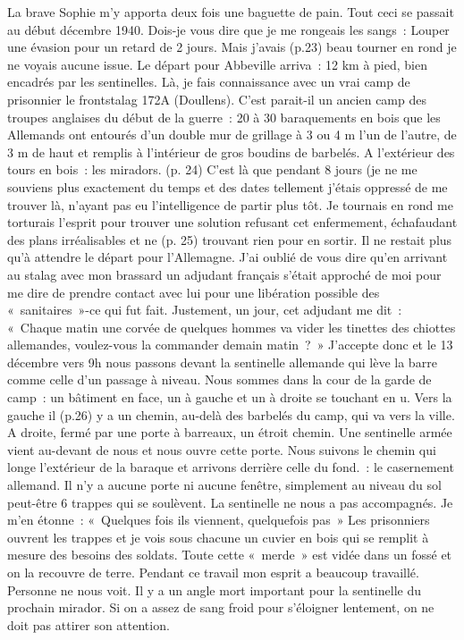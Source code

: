 \documentclass[a5paper,pagesize,10pt,bibtotoc,pointlessnumbers,
normalheadings,DIV=9,twoside=false]{scrbook}
\begin{document}
	La brave Sophie m’y apporta deux fois une baguette de pain. Tout ceci se passait au début décembre 1940. Dois-je vous dire que je me rongeais les sangs : Louper une évasion pour un retard de 2 jours. Mais j’avais (p.23) beau tourner en rond je ne voyais aucune issue.
	Le départ pour Abbeville arriva : 12 km à pied, bien encadrés par les sentinelles.
	Là, je fais connaissance avec un vrai camp de prisonnier le frontstalag 172A (Doullens). C’est parait-il un ancien camp des troupes anglaises du début de la guerre : 20 à 30 baraquements en bois que les Allemands ont entourés d’un double mur de grillage à 3 ou 4 m l’un de l’autre, de 3 m de haut et remplis à l’intérieur de gros boudins de barbelés. A l’extérieur des tours en bois : les miradors. 
	(p. 24) C’est là que pendant 8 jours (je ne me souviens plus exactement du temps et des dates tellement j’étais oppressé de me trouver là, n’ayant pas eu l’intelligence de partir plus tôt. Je tournais en rond me torturais l’esprit pour trouver une solution refusant cet enfermement, échafaudant des plans irréalisables et ne (p. 25) trouvant rien pour en sortir. Il ne restait plus qu’à attendre le départ pour l’Allemagne. J’ai oublié de vous dire qu’en arrivant au stalag avec mon brassard un adjudant français s’était approché de moi pour me dire de prendre contact avec lui pour une libération possible des « sanitaires »-ce qui fut fait.
	Justement, un jour, cet adjudant me dit : « Chaque matin une corvée de quelques hommes va vider les tinettes des chiottes allemandes, voulez-vous la commander demain matin ? » J’accepte donc et le 13 décembre vers 9h nous passons devant la sentinelle allemande qui lève la barre comme celle d’un passage à niveau. Nous sommes dans la cour de la garde de camp : un bâtiment en face, un à gauche et un à droite se touchant en u. Vers la gauche il (p.26) y a un chemin, au-delà des barbelés du camp, qui va vers la ville. A droite, fermé par une porte à barreaux, un étroit chemin. Une sentinelle armée vient au-devant de nous et nous ouvre cette porte. Nous suivons le chemin qui longe l’extérieur de la baraque et arrivons derrière celle du fond. : le casernement allemand. Il n’y a aucune porte ni aucune fenêtre, simplement au niveau du sol peut-être 6 trappes qui se soulèvent. La sentinelle ne nous a pas accompagnés. Je m’en étonne : « Quelques fois ils viennent, quelquefois pas » Les prisonniers ouvrent les trappes et je vois sous chacune un cuvier en bois qui se remplit à mesure des besoins des soldats. Toute cette « merde » est vidée dans un fossé et on la recouvre de terre. Pendant ce travail mon esprit a beaucoup travaillé. Personne ne nous voit. Il y a un angle mort important pour la sentinelle du prochain mirador. Si on a assez de sang froid pour s’éloigner lentement, on ne doit pas attirer son attention.
\end{document}
